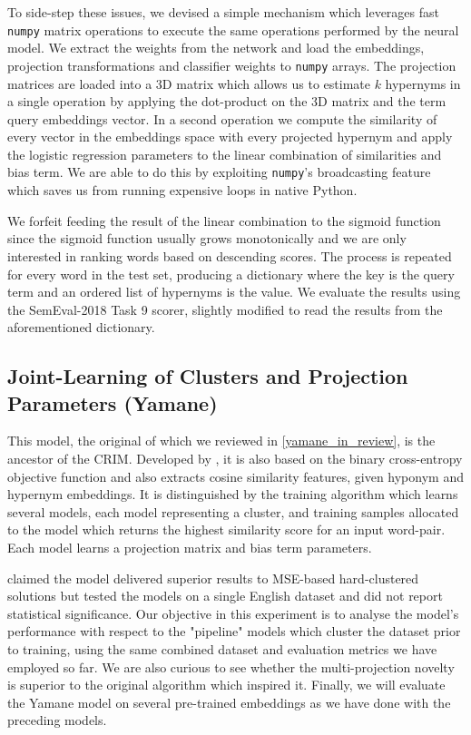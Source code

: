To side-step these issues, we devised a simple mechanism which leverages fast \texttt{numpy} matrix operations to execute the same operations performed by the neural model.  We extract the weights from the network and load the embeddings, projection transformations and classifier weights to \texttt{numpy} arrays.  The projection matrices are loaded into a 3D matrix which allows us to estimate $k$ hypernyms in a single operation by applying the dot-product on the 3D matrix and the term query embeddings vector.  In a second operation we compute the similarity of every vector in the embeddings space with every projected hypernym and apply the logistic regression parameters to the linear combination of similarities and bias term.  We are able to do this by exploiting \texttt{numpy}'s broadcasting feature which saves us from running expensive loops in native Python.  

We forfeit feeding the result of the linear combination to the sigmoid function since the sigmoid function usually grows monotonically and we are only interested in ranking words based on descending scores.  The process is repeated for every word in the test set, producing a dictionary where the key is the query term and an ordered list of hypernyms is the value.  We evaluate the results using the SemEval-2018 Task 9 scorer, slightly modified to read the results from the aforementioned dictionary.

\subsection{Joint-Learning of Clusters and Projection Parameters (Yamane)}
This model, the original of which we reviewed in \cref{yamane_in_review}, is the ancestor of the CRIM.  Developed by \citet{yamane2016distributional}, it is also based on the binary cross-entropy objective function and also extracts cosine similarity features, given hyponym and hypernym embeddings.  It is distinguished by the training algorithm which learns several models, each model representing a cluster, and training samples allocated to the model which returns the highest similarity score for an input word-pair.  Each model learns a projection matrix and bias term parameters.

\citet{yamane2016distributional} claimed the model delivered superior results to \ac{MSE}-based hard-clustered solutions but tested the models on a single English dataset and did not report statistical significance.  Our objective in this experiment is to analyse the model's performance with respect to the "pipeline" models which cluster the dataset prior to training, using the same combined dataset and evaluation metrics we have employed so far.  We are also curious to see whether the multi-projection novelty is superior to the original algorithm which inspired it.  Finally, we will evaluate the Yamane model on several pre-trained embeddings as we have done with the preceding models.  

